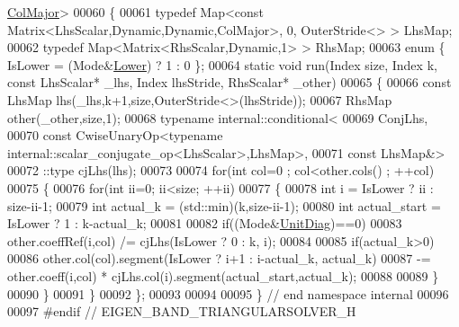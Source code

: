 \begin{DoxyCode}
      \hyperlink{group__enums_ggaacded1a18ae58b0f554751f6cdf9eb13a0cbd4bdd0abcfc0224c5fcb5e4f6669a}{ColMajor}>
00060 \{
00061   \textcolor{keyword}{typedef} Map<const Matrix<LhsScalar,Dynamic,Dynamic,ColMajor>, 0, OuterStride<> > LhsMap;
00062   \textcolor{keyword}{typedef} Map<Matrix<RhsScalar,Dynamic,1> > RhsMap;
00063   \textcolor{keyword}{enum} \{ IsLower = (Mode&\hyperlink{group__enums_gga39e3366ff5554d731e7dc8bb642f83cda891792b8ed394f7607ab16dd716f60e6}{Lower}) ? 1 : 0 \};
00064   \textcolor{keyword}{static} \textcolor{keywordtype}{void} run(Index size, Index k, \textcolor{keyword}{const} LhsScalar* \_lhs, Index lhsStride, RhsScalar* \_other)
00065   \{
00066     \textcolor{keyword}{const} LhsMap lhs(\_lhs,k+1,size,OuterStride<>(lhsStride));
00067     RhsMap other(\_other,size,1);
00068     \textcolor{keyword}{typename} internal::conditional<
00069                           ConjLhs,
00070                           \textcolor{keyword}{const} CwiseUnaryOp<typename internal::scalar\_conjugate\_op<LhsScalar>,LhsMap>,
00071                           \textcolor{keyword}{const} LhsMap&>
00072                         ::type cjLhs(lhs);
00073                         
00074     \textcolor{keywordflow}{for}(\textcolor{keywordtype}{int} col=0 ; col<other.cols() ; ++col)
00075     \{
00076       \textcolor{keywordflow}{for}(\textcolor{keywordtype}{int} ii=0; ii<size; ++ii)
00077       \{
00078         \textcolor{keywordtype}{int} i = IsLower ? ii : size-ii-1;
00079         \textcolor{keywordtype}{int} actual\_k = (std::min)(k,size-ii-1);
00080         \textcolor{keywordtype}{int} actual\_start = IsLower ? 1 : k-actual\_k;
00081         
00082         \textcolor{keywordflow}{if}((Mode&\hyperlink{group__enums_gga39e3366ff5554d731e7dc8bb642f83cdaddb72f888ac85d5a1c52333e54f9374b}{UnitDiag})==0)
00083           other.coeffRef(i,col) /= cjLhs(IsLower ? 0 : k, i);
00084 
00085         \textcolor{keywordflow}{if}(actual\_k>0)
00086           other.col(col).segment(IsLower ? i+1 : i-actual\_k, actual\_k)
00087               -= other.coeff(i,col) * cjLhs.col(i).segment(actual\_start,actual\_k);
00088         
00089       \}
00090     \}
00091   \}
00092 \};
00093 
00094 
00095 \} \textcolor{comment}{// end namespace internal}
00096 
00097 \textcolor{preprocessor}{#endif // EIGEN\_BAND\_TRIANGULARSOLVER\_H}
\end{DoxyCode}
